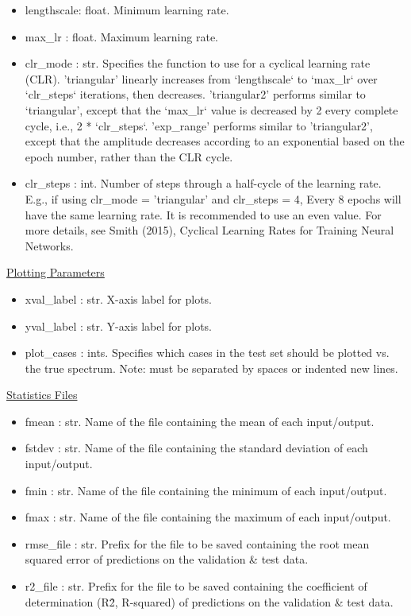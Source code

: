 \documentclass[letterpaper, 12pt]{article}
\begin{document}
\begin{itemize}
\item lengthscale: float. Minimum learning rate.
\item max\_lr     : float. Maximum learning rate.
\item clr\_mode   : str.   Specifies the function to use for a cyclical learning rate 
                    (CLR).
                    'triangular' linearly increases from `lengthscale` to 
                    `max\_lr` over `clr\_steps` iterations, then decreases.
                    'triangular2' performs similar to `triangular', except that 
                    the `max\_lr` value is decreased by 2 every complete cycle,
                    i.e., 2 * `clr\_steps`.
                    'exp\_range' performs similar to 'triangular2', except that 
                    the amplitude decreases according to an exponential based 
                    on the epoch number, rather than the CLR cycle.
\item clr\_steps  : int.   Number of steps through a half-cycle of the learning rate.
                    E.g., if using clr\_mode = 'triangular' and clr\_steps = 4, 
                    Every 8 epochs will have the same learning rate.
                    It is recommended to use an even value.
                    For more details, see Smith (2015), Cyclical Learning Rates 
                    for Training Neural Networks.
\end{itemize}

\noindent \underline{Plotting Parameters}
\begin{itemize}
\item xval\_label : str.  X-axis label for plots.
\item yval\_label : str.  Y-axis label for plots.
\item plot\_cases : ints. Specifies which cases in the test set should be 
                   plotted vs. the true spectrum.
                   Note: must be separated by spaces or indented new lines.
\end{itemize}

\noindent \underline{Statistics Files}
\begin{itemize}
\item fmean      : str.  Name of the file containing the mean of each input/output.
\item fstdev     : str.  Name of the file containing the standard deviation of each 
                   input/output.
\item fmin       : str.  Name of the file containing the minimum of each input/output.
\item fmax       : str.  Name of the file containing the maximum of each input/output.
\item rmse\_file  : str.  Prefix for the file to be saved containing the root mean 
                   squared error of predictions on the validation \& test data.
\item r2\_file    : str.  Prefix for the file to be saved containing the coefficient of
                   determination (R\^2, R-squared) of predictions on the 
                   validation \& test data.
\end{itemize}
\end{document}
